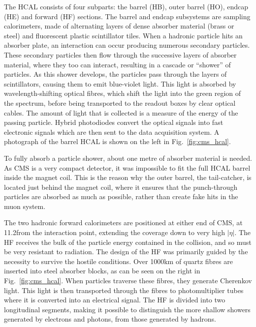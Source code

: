 The HCAL consists of four subparts: the barrel (HB), outer barrel (HO), endcap (HE) and forward
(HF) sections. The barrel and endcap subsystems are sampling calorimeters, made of alternating
layers of dense absorber material (brass or steel) and fluorescent plastic scintillator tiles.
When a hadronic particle hits an absorber plate, an interaction can occur producing numerous
secondary particles. These secondary particles then flow through the successive layers of absorber
material, where they too can interact, resulting in a cascade or “shower” of particles.
As this shower develops, the particles pass through the layers of scintillators, causing them to
emit blue-violet light. This light is absorbed by wavelength-shifting optical fibres, which shift
the light into the green region of the spectrum, before being transported to the readout boxes by
clear optical cables. The amount of light that is collected is a measure of the energy of the
passing particle. Hybrid photodiodes convert the optical signals into fast electronic signals which
are then sent to the data acquisition system. A photograph of the barrel HCAL is shown on the left
in Fig.~\ref{fig:cms_hcal}. 

To fully absorb a particle shower, about one metre of absorber material is needed. As CMS is a
very compact detector, it was impossible to fit the full HCAL barrel inside the magnet coil. This
is the reason why the outer barrel, the tail-catcher, is located just behind the magnet coil, where
it ensures that the punch-through particles are absorbed as much as possible, rather than create
fake hits in the muon system. 

The two hadronic forward calorimeters are positioned at either end of CMS, at 11.2\meter from
the interaction point, extending the coverage down to very high $|\eta|$. 
The HF receives the bulk of the particle energy contained in the collision, and so must be very
resistant to radiation. The design of the HF was primarily guided by the necessity to survive the
hostile conditions. Over 1000\unit{km} of quartz fibres are inserted into steel absorber
blocks, as can be seen on the right in Fig.~\ref{fig:cms_hcal}. 
When particles traverse these fibres, they generate Cherenkov light. This light is then
transported through the fibres to photomultiplier tubes where it is converted into an electrical
signal. 
The HF is divided into two longitudinal segments, making it possible to distinguish the more shallow
showers generated by electrons and photons, from those generated by hadrons.

